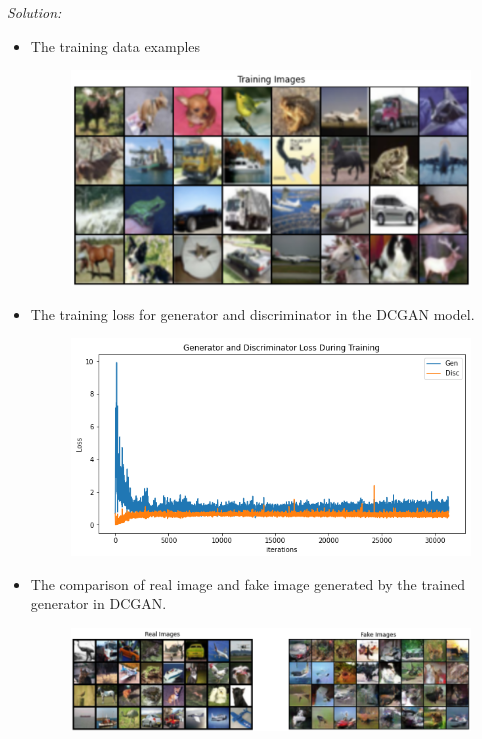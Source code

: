 \documentclass[a4paper, 11pt]{article}
\newenvironment{solution}
    {\textit{Solution:}}
    {}
\begin{document}
\begin{solution}

\begin{itemize}
\item The training data examples
\begin{figure}[H]
\centering    \includegraphics[scale=0.4]{example.png}
    \label{fig:1-1}
\end{figure}

\item The training loss for generator and discriminator in the DCGAN model.
\begin{figure}[H]
\centering    \includegraphics[scale=0.6]{DCGAN-loss.png}
    \label{fig:1-2}
\end{figure}

\item The comparison of real image and fake image generated by the trained generator in DCGAN.

\begin{figure}[H]
\centering    \includegraphics[scale=0.4]{DC-GAN-compare.png}
    \label{fig:1-3}
\end{figure}



\end{itemize}
\end{solution}
\end{document}
